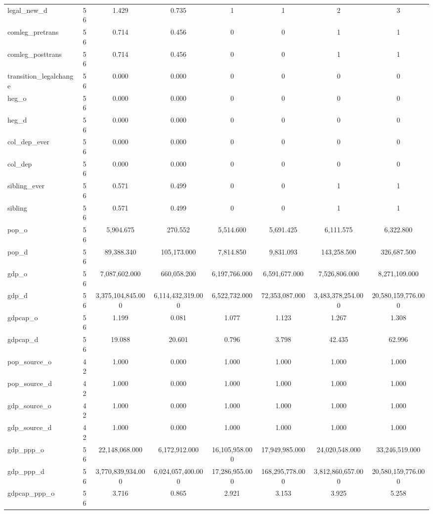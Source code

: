 \begin{table}[!htbp]
\begin{tabular}{@{\extracolsep{5pt}}lccccccc}
legal\_new\_d & 56 & 1.429 & 0.735 & 1 & 1 & 2 & 3 \\ 
comleg\_pretrans & 56 & 0.714 & 0.456 & 0 & 0 & 1 & 1 \\ 
comleg\_posttrans & 56 & 0.714 & 0.456 & 0 & 0 & 1 & 1 \\ 
transition\_legalchange & 56 & 0.000 & 0.000 & 0 & 0 & 0 & 0 \\ 
heg\_o & 56 & 0.000 & 0.000 & 0 & 0 & 0 & 0 \\ 
heg\_d & 56 & 0.000 & 0.000 & 0 & 0 & 0 & 0 \\ 
col\_dep\_ever & 56 & 0.000 & 0.000 & 0 & 0 & 0 & 0 \\ 
col\_dep & 56 & 0.000 & 0.000 & 0 & 0 & 0 & 0 \\ 
sibling\_ever & 56 & 0.571 & 0.499 & 0 & 0 & 1 & 1 \\ 
sibling & 56 & 0.571 & 0.499 & 0 & 0 & 1 & 1 \\ 
pop\_o & 56 & 5,904.675 & 270.552 & 5,514.600 & 5,691.425 & 6,111.575 & 6,322.800 \\ 
pop\_d & 56 & 89,388.340 & 105,173.000 & 7,814.850 & 9,831.093 & 143,258.500 & 326,687.500 \\ 
gdp\_o & 56 & 7,087,602.000 & 660,058.200 & 6,197,766.000 & 6,591,677.000 & 7,526,806.000 & 8,271,109.000 \\ 
gdp\_d & 56 & 3,375,104,845.000 & 6,114,432,319.000 & 6,522,732.000 & 72,353,087.000 & 3,483,378,254.000 & 20,580,159,776.000 \\ 
gdpcap\_o & 56 & 1.199 & 0.081 & 1.077 & 1.123 & 1.267 & 1.308 \\ 
gdpcap\_d & 56 & 19.088 & 20.601 & 0.796 & 3.798 & 42.435 & 62.996 \\ 
pop\_source\_o & 42 & 1.000 & 0.000 & 1.000 & 1.000 & 1.000 & 1.000 \\ 
pop\_source\_d & 42 & 1.000 & 0.000 & 1.000 & 1.000 & 1.000 & 1.000 \\ 
gdp\_source\_o & 42 & 1.000 & 0.000 & 1.000 & 1.000 & 1.000 & 1.000 \\ 
gdp\_source\_d & 42 & 1.000 & 0.000 & 1.000 & 1.000 & 1.000 & 1.000 \\ 
gdp\_ppp\_o & 56 & 22,148,068.000 & 6,172,912.000 & 16,105,958.000 & 17,949,985.000 & 24,020,548.000 & 33,246,519.000 \\ 
gdp\_ppp\_d & 56 & 3,770,839,934.000 & 6,024,057,400.000 & 17,286,955.000 & 168,295,778.000 & 3,812,860,657.000 & 20,580,159,776.000 \\ 
gdpcap\_ppp\_o & 56 & 3.716 & 0.865 & 2.921 & 3.153 & 3.925 & 5.258 \\ 

\end{tabular}
\end{table}
